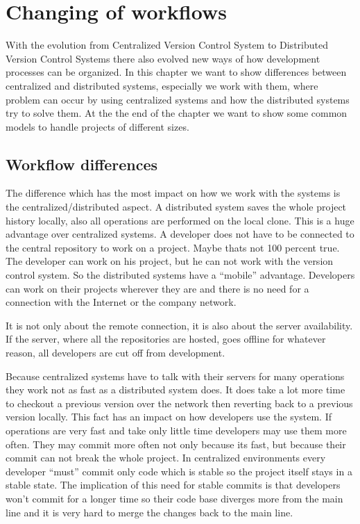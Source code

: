 \section{Changing of workflows}\label{changeofworkflows}

With the evolution from Centralized Version Control System to Distributed Version Control Systems there also 
evolved new ways of how development processes can be organized. In this chapter we want to show differences 
between centralized and distributed systems, especially we work with them, where problem can occur by using 
centralized systems and how the distributed systems try to solve them. At the the end of the chapter we want 
to show some common models to handle projects of different sizes.

\subsection{Workflow differences}

The difference which has the most impact on how we work with the systems is the centralized/distributed aspect. 
A distributed system saves the whole project history locally, also all operations are performed on the local clone. 
This is a huge advantage over centralized systems. A developer does not have to be connected to the central 
repository to work on a project. Maybe thats not 100 percent true. The developer can work on his project, but 
he can not work with the version control system. So the distributed systems have a “mobile” advantage. 
Developers can work on their projects wherever they are and there is no need for a connection with the 
Internet or the company network.

It is not only about the remote connection, it is also about the server availability. If the server, where 
all the repositories are hosted, goes offline for whatever reason, all developers are cut off from development.

Because centralized systems have to talk with their servers for many operations they work not as fast as 
a distributed system does. It does take a lot more time to checkout a previous version over the network 
then reverting back to a previous version locally. This fact has an impact on how developers use the system. 
If operations are very fast and take only little time developers may use them more often. They may commit 
more often not only because its fast, but because their commit can not break the whole project. 
In centralized environments every developer “must” commit only code which is stable so the project 
itself stays in a stable state. The implication of this need for stable commits is that developers won't 
commit for a longer time so their code base diverges more from the main line and it is very hard 
to merge the changes back to the main line.

